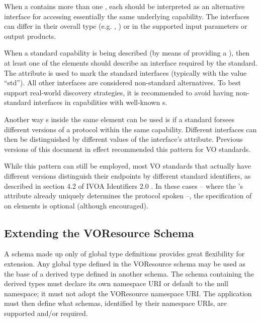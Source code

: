 \documentclass[11pt,a4paper]{ivoa}
\begin{document}
When a  contains more than one
, each  should be
interpreted as an alternative interface for accessing essentially the
same underlying capability.  The interfaces can differ in their
overall type (e.g. ,
) or in the supported input parameters or
output products.  


When a standard capability is being described (by means of providing a
), then at least one of the
 elements should describe an interface required
by the standard.  The  attribute is used to mark the
standard interfaces (typically with the value ``std'').
All other interfaces are considered non-standard
alternatives.  To best support real-world discovery strategies, it is
recommended to avoid having non-standard interfaces in capabilities
with well-known s.

Another way s inside the same
 element can be used is if a standard forsees
different versions of a protocol within the same capability.  Different
interfaces can then be distinguished by different values of the
interface's  attribute.  Previous versions of this
document in effect recommended this pattern for VO standards.

While this pattern can still be employed, most VO standards that
actually have different versions distinguish their endpoints by
different standard identifiers, as described in section 4.2 of IVOA
Identifiers 2.0 \citep{2016ivoa.spec.0523D}.  In these cases -- where the
's  attribute already uniquely
determines the protocol spoken --, the specification of 
on  elements is optional (although encouraged).

\subsection{Extending the VOResource Schema}

\label{sect:extending}

A schema made up only of global type definitions provides great
flexibility for extension.  Any global type defined in the VOResource
schema may be used as the base of a derived type defined in another
schema.  The schema containing the derived types must declare its own
namespace URI or default to the null namespace; it must not adopt the
VOResource namespace URI.  The application must then define what
schemas, identified by their namespace URIs, are supported and/or
required.  
\end{document}

